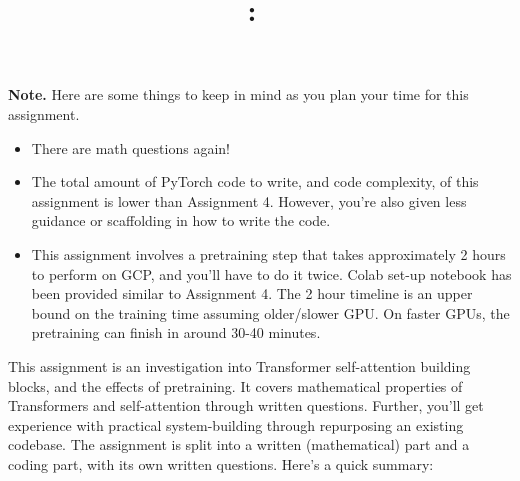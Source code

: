 \documentclass[answers]{exam}
\title{
\textmd{\textbf{\hmwkClass:\ \hmwkTitle}}
}
\author{}
\date{}
\begin{document}
\vspace{-1in}

\maketitle

\vspace{-0.5in}


\begin{framed}
\noindent
 \textbf{Note.} Here are some things to keep in mind as you plan your time for this assignment.
\begin{itemize}
   \item There are math questions again!
   \item The total amount of PyTorch code to write, and code complexity, of this assignment is lower than Assignment 4. 
         However, you're also given less guidance or scaffolding in how to write the code.
         \item  This assignment involves a pretraining step that takes approximately 2 hours to perform on GCP, and you'll have to do it twice. Colab set-up notebook has been provided similar to Assignment 4. The 2 hour timeline is an upper bound on the training time assuming older/slower GPU. On faster GPUs, the pretraining can finish in around 30-40 minutes.
\end{itemize}

\end{framed}
This assignment is an investigation into Transformer self-attention building blocks, and the effects of pretraining.
It covers mathematical properties of Transformers and self-attention through written questions.
Further, you'll get experience with practical system-building through repurposing an existing codebase.
The assignment is split into a written (mathematical) part and a coding part, with its own written questions.
Here's a quick summary:
\end{document}
